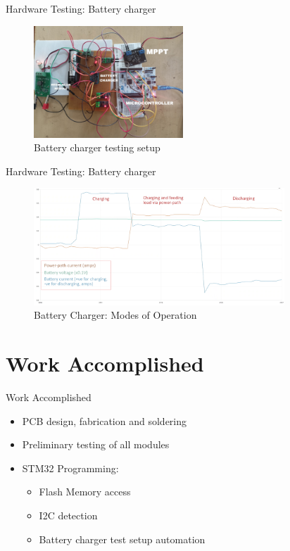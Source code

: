 \documentclass[aspectratio=169]{beamer}
\begin{document}
    \begin{frame}{Hardware Testing: Battery charger}
        \begin{figure}[h]
				\centering
				\includegraphics[width=0.5\textwidth]{diag/Bat_cha_test.jpg}
				\caption{Battery charger testing setup}
				\label{fig:mesh1}
			\end{figure}
		
	\end{frame}

    \begin{frame}{Hardware Testing: Battery charger}
	\begin{figure}[h]
		\centering
		\includegraphics[width=0.84\textwidth]{diag/Bat_cha_opmodes.png}
		\caption{Battery Charger: Modes of Operation}
		\label{fig:mesh1}
	\end{figure}
	
\end{frame}




\section{Work Accomplished}
						\begin{frame}{Work Accomplished}
		\begin{itemize}
			\item  PCB design, fabrication and soldering
			\item Preliminary testing of all modules
			\item STM32 Programming:
			\begin{itemize}
				\item Flash Memory access
				\item I2C detection
				\item Battery charger test setup automation
				
				
			\end{itemize}
		\end{itemize}
	\end{frame}
	
\end{document}
